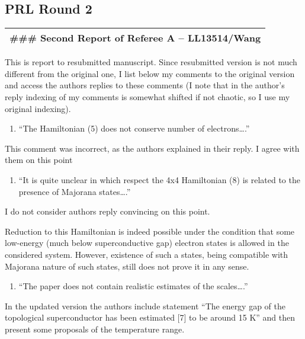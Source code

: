 \documentclass[11pt]{article}
\providecommand{\tightlist}{%
      \setlength{\itemsep}{0pt}\setlength{\parskip}{0pt}}
\begin{document}
\hypertarget{prl-round-2}{%
\subsection{PRL Round 2}\label{prl-round-2}}

\begin{longtable}[]{@{}l@{}}
\toprule
\endhead
\#\#\# Second Report of Referee A -- LL13514/Wang\tabularnewline
\bottomrule
\end{longtable}

This is report to resubmitted manuscript. Since resubmitted version is
not much different from the original one, I list below my comments to
the original version and access the authors replies to these comments (I
note that in the author's reply indexing of my comments is somewhat
shifted if not chaotic, so I use my original indexing).

\begin{enumerate}
\def\labelenumi{\arabic{enumi}.}
\tightlist
\item
  ``The Hamiltonian (5) does not conserve number of electrons\ldots{}.''
\end{enumerate}

This comment was incorrect, as the authors explained in their reply. I
agree with them on this point

\begin{enumerate}
\def\labelenumi{\arabic{enumi}.}
\setcounter{enumi}{1}
\tightlist
\item
  ``It is quite unclear in which respect the 4x4 Hamiltonian (8) is
  related to the presence of Majorana states\ldots{}.''
\end{enumerate}

I do not consider authors reply convincing on this point.

Reduction to this Hamiltonian is indeed possible under the condition
that some low-energy (much below superconductive gap) electron states is
allowed in the considered system. However, existence of such a states,
being compatible with Majorana nature of such states, still does not
prove it in any sense.

\begin{enumerate}
\def\labelenumi{\arabic{enumi}.}
\setcounter{enumi}{2}
\tightlist
\item
  ``The paper does not contain realistic estimates of the
  scales\ldots{}.''
\end{enumerate}

In the updated version the authors include statement ``The energy gap of
the topological superconductor has been estimated {[}7{]} to be around
15 K'' and then present some proposals of the temperature range.
\end{document}
